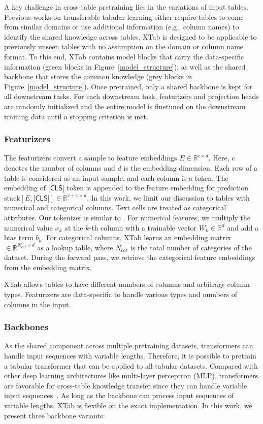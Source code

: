 A key challenge in cross-table pretraining lies in the variations of input tables. Previous works on transferable tabular learning either require tables to come from similar domains \citep{levin2022transfer} or use additional information (e.g., column names) to identify the shared knowledge across tables. XTab is designed to be applicable to previously unseen tables with no assumption on the domain or column name format. To this end, XTab contains  model blocks that carry the data-specific information (green blocks in Figure~\ref{model_structure}), as well as the shared backbone that stores the common knowledge (grey blocks in Figure~\ref{model_structure}). Once pretrained, only a shared backbone is kept for all downstream tasks. For each downstream task, featurizers and projection heads are randomly initialized and the entire model is finetuned on the downstream training data until a stopping criterion is met.

\subsubsection{Featurizers} \label{Featurizers} 
The featurizers convert a sample to feature embeddings $E \in \mathbb{R}^{c \times d}$. Here, $c$ denotes the number of columns and $d$ is the embedding dimension. Each row of a table is considered as an input sample, and each column is a token. The embedding of $\textsf{[CLS]}$ token is appended to the feature embedding for prediction $\text{stack}[E, \textsf{[CLS]}] \in \mathbb{R}^{c+1 \times d}$. In this work, we limit our discussion to tables with numerical and categorical columns. Text cells are treated as categorical attributes. Our tokenizer is similar to \citet{gorishniy2021revisiting}. For numerical features, we multiply the numerical value $x_{k}$ at the $k$-th column with a trainable vector $W_k \in \mathbb{R}^{d}$ and add a bias term $b_k$. For categorical columns, XTab learns an embedding matrix $\in \mathbb{R}^{N_{cat} \times d}$ as a lookup table, where $N_{cat}$ is the total number of categories of the dataset. During the forward pass, we retrieve the categorical feature embeddings from the embedding matrix.

XTab allows tables to have different numbers of columns and arbitrary column types. Featurizers are data-specific to handle various types and numbers of columns in the input.

\subsubsection{Backbones} \label{method_backbone} 
As the shared component across multiple pretraining datasets, transformers can handle input sequences with variable lengths. Therefore, it is possible to pretrain a tabular transformer that can be applied to all tabular datasets. Compared with other deep learning architectures like multi-layer perceptron (MLP), transformers are  favorable for cross-table knowledge transfer since they can handle variable input sequences~\citep{wang2022transtab}. As long as the backbone can process input sequences of variable lengths, XTab is flexible on the exact implementation. In this work, we present three  backbone variants: 

